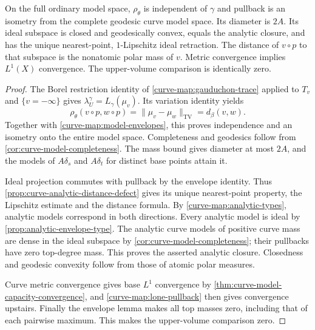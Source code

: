 \begin{proposition}\label{curve-map:complete-model-metric}
On the full ordinary model space, $\rho_\theta$ is independent
of $\gamma$ and pullback is an isometry from the complete geodesic
curve model space. Its diameter is $2A$. Its ideal subspace is
closed and geodesically convex, equals the analytic closure,
and has the unique nearest-point, $1$-Lipschitz ideal retraction.
The distance of $v\circ p$ to that subspace is the nonatomic polar
mass of $v$. Metric convergence implies $L^1(X)$ convergence.
The upper-volume comparison is identically zero.
\end{proposition}
\begin{proof}
The Borel restriction identity of \cref{curve-map:gauduchon-trace}
applied to $T_v$ and $\{v=-\infty\}$ gives
$\lambda_U^\gamma=L_\gamma(\mu_v)$. Its variation identity yields
\[
 \rho_\theta(v\circ p,w\circ p)
       =\|\mu_v-\mu_w\|_{\mathrm{TV}}=d_\beta(v,w).
\]
Together with \cref{curve-map:model-envelopes}, this proves
independence and an isometry onto the entire model space.
Completeness and geodesics follow from
\cref{cor:curve-model-completeness}. The mass bound gives diameter
at most $2A$, and the models of $A\delta_s$ and $A\delta_t$ for
distinct base points attain it.

Ideal projection commutes with pullback by the envelope identity.
Thus \cref{prop:curve-analytic-distance-defect} gives its unique
nearest-point property, the Lipschitz estimate and the distance
formula. By \cref{curve-map:analytic-types}, analytic models
correspond in both directions. Every analytic model is ideal by
\cref{prop:analytic-envelope-type}. The analytic curve models of
positive curve mass are dense in the ideal subspace by
\cref{cor:curve-model-completeness}; their pullbacks have zero
top-degree mass. This proves the asserted analytic closure.
Closedness and geodesic convexity follow from those of atomic
polar measures.

Curve metric convergence gives base $L^1$ convergence by
\cref{thm:curve-model-capacity-convergence}, and
\cref{curve-map:lone-pullback} then gives convergence upstairs.
Finally the envelope lemma makes all top masses zero, including
that of each pairwise maximum. This makes the upper-volume
comparison zero.
\end{proof}


